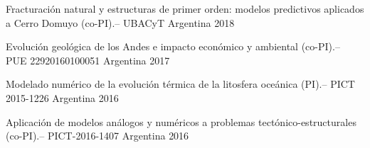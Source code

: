 \begin{cvhonors}
\cvhonor
    {Fracturación natural y estructuras de primer orden: modelos predictivos aplicados a Cerro Domuyo (co-PI).–} %
    {UBACyT} %
    {Argentina} %
    {2018} %

\cvhonor
    {Evolución geológica de los Andes e impacto económico y ambiental (co-PI).–}  {PUE 22920160100051} %
    {Argentina} %
    {2017} %


\cvhonor
    {Modelado numérico de la evolución térmica de la litosfera oceánica (PI).–}
    {PICT 2015-1226} 
    {Argentina} %
    {2016} %


\cvhonor
    {Aplicación de modelos análogos y numéricos a problemas tectónico-estructurales (co-PI).–}
    {PICT-2016-1407} %
    {Argentina} %
    {2016} %












\end{cvhonors}


